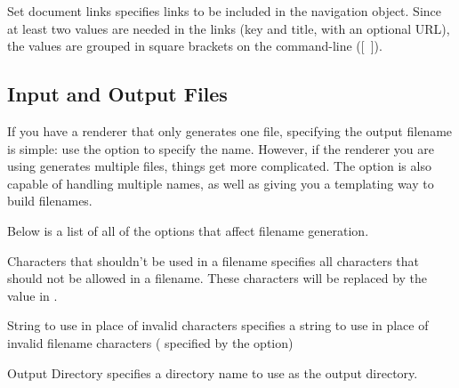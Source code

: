 \begin{configuration}{Set document links}
specifies links to be included in the navigation object.  Since at
least two values are needed in the links (key and title, with an optional
URL), the values are grouped in square brackets on the command-line ([~]).
\end{configuration}


\subsection{Input and Output Files\label{sec:config-files}}

If you have a renderer that only generates one file, specifying the output
filename is simple: use the  option to specify
the name.  However, if the renderer you are using generates multiple
files, things get more complicated.  The  option
is also capable of handling multiple names, as well as giving you a
templating way to build filenames.

Below is a list of all of the options that affect filename generation.

\begin{configuration}{Characters that shouldn't be used in a filename}
specifies all characters that should not be allowed in a filename.
These characters will be replaced by the value in
.
\end{configuration}

\begin{configuration}{String to use in place of invalid characters}
specifies a string to use in place of invalid filename characters (
specified by the  option)
\end{configuration}

\begin{configuration}{Output Directory}
specifies a directory name to use as the output directory.
\end{configuration}

